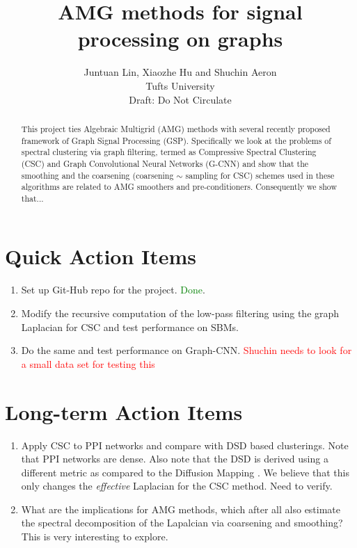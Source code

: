 \documentclass{article}
\title{AMG methods for signal processing on graphs}
\author{ Juntuan Lin, Xiaozhe Hu and Shuchin Aeron\\
Tufts University\\
Draft: Do Not Circulate}
\begin{document}

\maketitle

\begin{abstract}
  This project ties Algebraic Multigrid (AMG) methods with several recently proposed framework of Graph Signal Processing (GSP). Specifically we look at the problems of spectral clustering via graph filtering, termed as Compressive Spectral Clustering (CSC) and Graph Convolutional Neural Networks (G-CNN) and show that the smoothing and the coarsening (coarsening $\sim$ sampling for CSC) schemes used in these algorithms are related to AMG smoothers and pre-conditioners. Consequently we show that...  \end{abstract}

\section{Quick Action Items}

\begin{enumerate}
\item Set up Git-Hub repo for the project. \textcolor{green}{Done}.
	\item Modify the recursive computation of the low-pass filtering using the graph Laplacian for CSC and test performance on SBMs. 
	\item Do the same and test performance on Graph-CNN. \textcolor{red}{Shuchin needs to look for a small data set for testing this}
\end{enumerate}

\section{Long-term Action Items}
\begin{enumerate}
	\item Apply CSC to PPI networks and compare with DSD based clusterings. Note that PPI networks are dense. Also note that the DSD is derived using a different metric as compared to the Diffusion Mapping \cite{xx}. We believe that this only changes the \emph{effective} Laplacian for the CSC method. Need to verify. 
	\item What are the implications for AMG methods, which after all also estimate the spectral decomposition of the Lapalcian via coarsening and smoothing? This is very interesting to explore. 
\end{enumerate}
\end{document}
